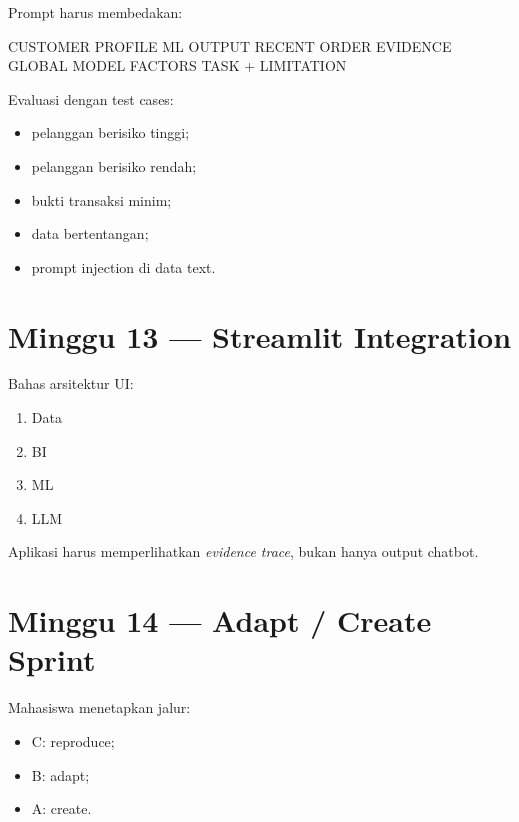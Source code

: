 \documentclass[
  indonesian,
  letterpaper,
  DIV=11,
  numbers=noendperiod]{scrreprt}
\newenvironment{Shaded}{\begin{snugshade}}{\end{snugshade}}
\newcommand{\NormalTok}[1]{\textcolor[rgb]{0.00,0.23,0.31}{#1}}
\providecommand{\tightlist}{%
  \setlength{\itemsep}{0pt}\setlength{\parskip}{0pt}}
\begin{document}
Prompt harus membedakan:

\begin{Shaded}
\begin{Highlighting}[]
\NormalTok{CUSTOMER PROFILE}
\NormalTok{ML OUTPUT}
\NormalTok{RECENT ORDER EVIDENCE}
\NormalTok{GLOBAL MODEL FACTORS}
\NormalTok{TASK + LIMITATION}
\end{Highlighting}
\end{Shaded}

Evaluasi dengan test cases:

\begin{itemize}
\tightlist
\item
  pelanggan berisiko tinggi;
\item
  pelanggan berisiko rendah;
\item
  bukti transaksi minim;
\item
  data bertentangan;
\item
  prompt injection di data text.
\end{itemize}

\section{Minggu 13 --- Streamlit
Integration}\label{minggu-13-streamlit-integration}

Bahas arsitektur UI:

\begin{enumerate}
\def\labelenumi{\arabic{enumi}.}
\tightlist
\item
  Data
\item
  BI
\item
  ML
\item
  LLM
\end{enumerate}

Aplikasi harus memperlihatkan \emph{evidence trace}, bukan hanya output
chatbot.

\section{Minggu 14 --- Adapt / Create
Sprint}\label{minggu-14-adapt-create-sprint}

Mahasiswa menetapkan jalur:

\begin{itemize}
\tightlist
\item
  C: reproduce;
\item
  B: adapt;
\item
  A: create.
\end{itemize}
\end{document}
